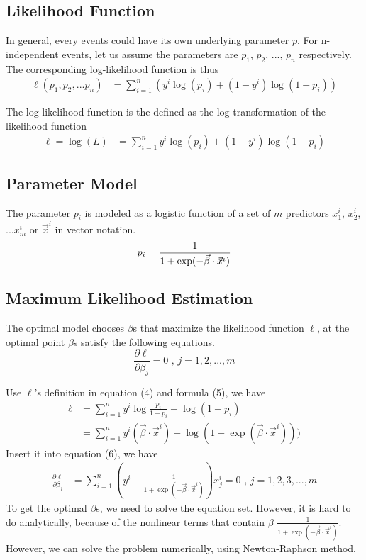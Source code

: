 \documentclass[12pt, oneside]{article}
\begin{document}
\subsection{Likelihood Function}
In general, every events could have its own underlying parameter $p$. For n-independent events, let us assume the parameters are $p_1$, $p_2$, ..., $p_n$ respectively. The corresponding log-likelihood function is thus
\begin{align}
\ell(p_1, p_2,...p_n)&=\sum\limits_{i=1}^{n}\left(y^i \log(p_i)+(1-y^i)\log(1-p_i)\right)
\end{align}

The log-likelihood function is the defined as the log transformation of the likelihood function
\begin{align}
\ell=\log(L)&={\sum_{i=1}^{n}y^i\log(p_i)+(1-y^i)\log(1-p_i)}
\end{align}

\subsection{Parameter Model}
The parameter $p_i$ is modeled as a logistic function of a set of $m$ predictors $x_1^i$, $x_2^i$, ...$x_m^i$ or $\vec{x}^i$ in vector notation.
\begin{equation}
\mathnormal{p_i}=\frac{1}{1+\mathnormal{\exp(-\vec{\beta}\cdot\vec{x}^i)}}
\end{equation}

\subsection{Maximum Likelihood Estimation}
The optimal model chooses $\beta$s that maximize the likelihood function $\ell$, at the optimal point $\beta$s satisfy the following equations.
\begin{equation}
\frac{\partial \ell}{\partial \beta_j}=0 \text{ , }j = 1, 2, ..., m
\end{equation}

Use $\ell$'s definition in equation (4) and formula (5), we have 
\begin{align*}
{\ell}&=\sum_{i=1}^{n}y^i\log\frac{p_i}{1-p_i}+\log(1-p_i)\\
&=\sum_{i=1}^{n}y^i(\vec{\beta}\cdot\vec{x}^i)-\log(1+\exp(\vec{\beta}\cdot\vec{x}^i)))
\end{align*}
Insert it into equation (6), we have
\begin{align*}
{\frac{\partial\ell}{\partial\beta_j}}
&={\sum_{i=1}^{n}\left (y^i-\frac{1}{1+\exp(-\vec{\beta}\cdot\vec{x}^i)} \right) x_{j}^{i}}=0 \text{ , } {j=1, 2, 3, ...,m}
\end{align*}
To get the optimal $\beta$s, we need to solve the equation set. However, it is hard to do analytically, because of the nonlinear terms that contain 
$\beta$ $\frac{1}{1+\exp(-\vec{\beta}\cdot\vec{x}^i)}$. However, we can solve the problem numerically, using Newton-Raphson method.
\end{document}
